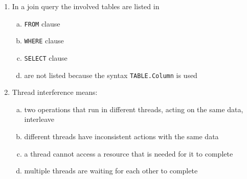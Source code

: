 \documentclass[10pt,a4paper,twocolumn]{article}
\begin{document}
\begin{enumerate}
\item In a join query the involved tables are listed in
\begin{enumerate}[(a)]
	\item \texttt{FROM} clause
	\item \texttt{WHERE} clause
	\item \texttt{SELECT} clause
	\item are not listed because the syntax \texttt{TABLE.Column} is used
\end{enumerate}
\item Thread interference means:
\begin{enumerate}[(a)]
	\item two operations that run in different threads, acting on the same data, interleave
	\item different threads have inconsistent actions with the same data
	\item a thread cannot access a resource that is needed for it to complete
	\item multiple threads are waiting for each other to complete
\end{enumerate}
\end{enumerate}
\clearpage
\end{document}
